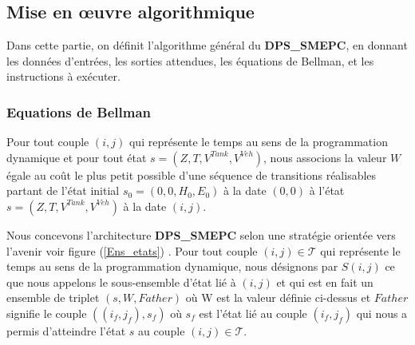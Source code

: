 \subsection{Mise en œuvre algorithmique}

Dans cette partie, on définit l'algorithme général du \textbf{DPS\_SMEPC}, en donnant les données d'entrées, les sorties attendues, les équations de Bellman, et les instructions à exécuter.	

\subsubsection{Equations de Bellman}
Pour tout couple $(i,j)$ qui représente le temps au sens de la programmation dynamique et pour tout état $s=(Z,T,V^{Tank},V^{Veh})$, nous associons la valeur $W$ égale au coût le plus petit possible d'une séquence de transitions réalisables partant de l'état initial $s_0=(0,0,H_0,E_0)$ à la date $(0,0)$ à l'état $s=(Z,T,V^{Tank},V^{Veh})$ à la date $(i,j)$.

Nous concevons l'architecture \textbf{DPS\_SMEPC} selon une stratégie orientée vers l'avenir voir figure (\ref{Ens_etats}) . Pour tout couple $(i, j) \in \mathcal{T}$ qui représente le temps au sens de la programmation dynamique, nous désignons par $S(i, j)$ ce que nous appelons le sous-ensemble d'état lié à $(i, j)$ et qui est en fait un ensemble de triplet $(s, W, Father)$ où W est la valeur définie ci-dessus et $Father$ signifie le couple $((i_f, j_f), s_f)$ où $s_f$ est l'état lié au couple $(i_f, j_f)$ qui nous a permis d'atteindre l'état $s$ au couple $(i, j) \in \mathcal{T}$.
 
